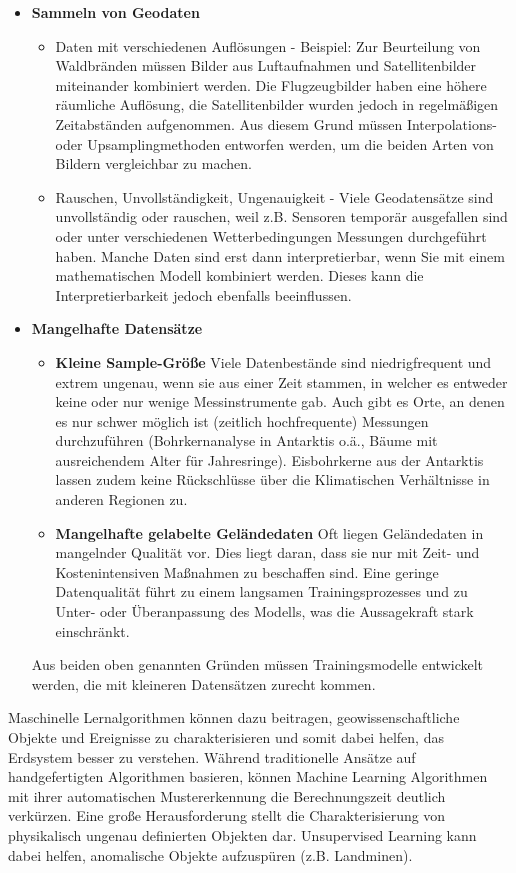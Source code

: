 \documentclass[11pt,ceqn]{book}
\begin{document}
\begin{itemize}
\item \textbf{Sammeln von Geodaten}
\begin{itemize}
\item Daten mit verschiedenen Auflösungen - Beispiel: Zur Beurteilung von Waldbränden müssen Bilder aus Luftaufnahmen und Satellitenbilder miteinander kombiniert werden. Die Flugzeugbilder haben eine höhere räumliche Auflösung, die Satellitenbilder wurden jedoch in regelmäßigen Zeitabständen aufgenommen. Aus diesem Grund müssen Interpolations- oder Upsamplingmethoden entworfen werden, um die beiden Arten von Bildern vergleichbar zu machen.
\item Rauschen, Unvollständigkeit, Ungenauigkeit - Viele Geodatensätze sind unvollständig oder rauschen, weil z.B. Sensoren temporär ausgefallen sind oder unter verschiedenen Wetterbedingungen Messungen durchgeführt haben. Manche Daten sind erst dann interpretierbar, wenn Sie mit einem mathematischen Modell kombiniert werden. Dieses kann die Interpretierbarkeit jedoch ebenfalls beeinflussen.
\end{itemize}

\item \textbf{Mangelhafte Datensätze}
\begin{itemize}
\item \textbf{Kleine Sample-Größe} Viele Datenbestände sind niedrigfrequent und extrem ungenau, wenn sie aus einer Zeit stammen, in welcher es entweder keine oder nur wenige Messinstrumente gab. Auch gibt es Orte, an denen es nur schwer möglich ist (zeitlich hochfrequente) Messungen durchzuführen (Bohrkernanalyse in Antarktis o.ä., Bäume mit ausreichendem Alter für Jahresringe). Eisbohrkerne aus der Antarktis lassen zudem keine Rückschlüsse über die Klimatischen Verhältnisse in anderen Regionen zu. 
\item  \textbf{Mangelhafte gelabelte Geländedaten} Oft liegen Geländedaten in mangelnder Qualität vor. Dies liegt daran, dass sie nur mit Zeit- und Kostenintensiven Maßnahmen zu beschaffen sind. Eine geringe Datenqualität führt zu einem langsamen Trainingsprozesses und zu Unter- oder Überanpassung des Modells, was die Aussagekraft stark einschränkt.
\end{itemize}
Aus beiden oben genannten Gründen müssen Trainingsmodelle entwickelt werden, die mit kleineren Datensätzen zurecht kommen.
\end{itemize}
\bigskip
Maschinelle Lernalgorithmen können dazu beitragen, geowissenschaftliche Objekte und Ereignisse zu charakterisieren und somit dabei helfen, das Erdsystem besser zu verstehen. Während traditionelle Ansätze auf handgefertigten Algorithmen basieren, können Machine Learning Algorithmen mit ihrer automatischen Mustererkennung die Berechnungszeit deutlich verkürzen. Eine große Herausforderung stellt die Charakterisierung von physikalisch ungenau definierten Objekten dar. Unsupervised Learning kann dabei helfen, anomalische Objekte aufzuspüren (z.B. Landminen).\\
\end{document}
